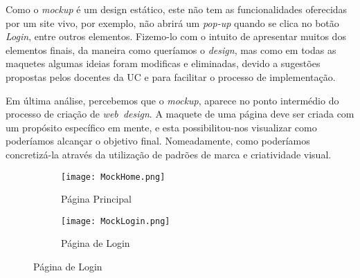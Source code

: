 \documentclass[11pt,a4paper]{report}
\begin{document}
Como o \emph{mockup} é um design estático, este não tem as funcionalidades oferecidas por um site vivo, por exemplo, não abrirá um \emph{pop-up} quando se clica no botão \emph{Login}, entre outros elementos. Fizemo-lo com o intuito de apresentar muitos dos elementos finais, da maneira como queríamos o \emph{design}, mas como em todas as maquetes algumas ideias foram modificas e eliminadas, devido a sugestões propostas pelos docentes da UC e para facilitar o processo de implementação.

Em última análise, percebemos que o \emph{mockup}, aparece no ponto intermédio do processo de criação de \emph{web\ design}. A maquete de uma página deve ser criada com um propósito específico em mente, e esta possibilitou-nos visualizar como poderíamos alcançar o objetivo final. Nomeadamente, como poderíamos concretizá-la através da utilização de padrões de marca e criatividade visual. 

\begin{figure}
     \centering
     \begin{subfigure}[h!]{0.4\textwidth}
         \centering
         \texttt{[image: MockHome.png]}
         \caption{Página Principal}
         \label{fig:MockHome}
     \end{subfigure}
     \hfill
     \begin{subfigure}[h!]{0.4\textwidth}
         \centering
         \texttt{[image: MockLogin.png]}
         \caption{Página de Login}
         \label{fig:MockLogin}
     \end{subfigure}
\end{figure}
\end{document}
